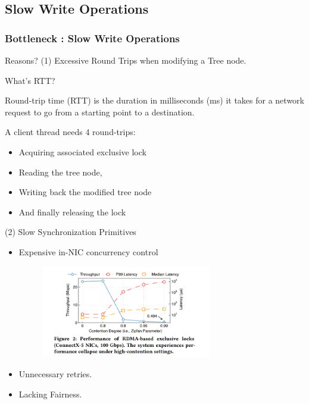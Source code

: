\documentclass[11pt]{beamer}                                                                                                   %
\begin{document}
\subsection{Slow Write Operations}
\begin{frame}[t]
	\frametitle{Bottleneck : Slow Write Operations}
	Reasons?
	(1) Excessive Round Trips when modifying a Tree node.
	
	
	What's RTT?
	
	
	Round-trip time (RTT) is the duration in milliseconds (ms) it takes for a network request to go from a starting point to a destination.
	
	
	
	\vspace{1cm}
	  
	  
	  
	A client thread needs 4 round-trips: 
	
				\begin{itemize}
		\item Acquiring associated exclusive lock
		\item Reading the tree node, 
		\item Writing back the modified tree node
		\item And finally releasing the lock
	\end{itemize}  
\end{frame}
\begin{frame}[t]
	(2) Slow Synchronization Primitives
	
	\begin{itemize}
		\item Expensive in-NIC concurrency control
			\begin{figure}[ht]%
			\centering  %
			\includegraphics[width=0.7\textwidth]{10.png}  
			
		\end{figure}
		\item Unnecessary retries.
		\item Lacking Fairness.
		
	\end{itemize}  


\end{frame}
\end{document}
